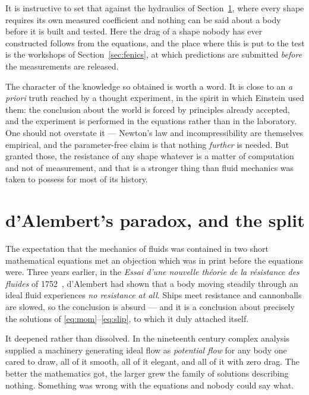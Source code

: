 \documentclass[11pt]{article}
\begin{document}
It is instructive to set that against the hydraulics of Section~\ref{sec:dalembert}, where every
shape requires its own measured coefficient and nothing can be said about a body before it is built
and tested. Here the drag of a shape nobody has ever constructed follows from the equations, and the
place where this is put to the test is the workshops of Section~\ref{sec:fenics}, at which
predictions are submitted \emph{before} the measurements are released.

The character of the knowledge so obtained is worth a word. It is close to an \emph{a priori} truth
reached by a thought experiment, in the spirit in which Einstein used them: the conclusion about the
world is forced by principles already accepted, and the experiment is performed in the equations
rather than in the laboratory. One should not overstate it --- Newton's law and incompressibility are
themselves empirical, and the parameter-free claim is that nothing \emph{further} is needed. But
granted those, the resistance of any shape whatever is a matter of computation and not of
measurement, and that is a stronger thing than fluid mechanics was taken to possess for most of its
history.

\section{d'Alembert's paradox, and the split}\label{sec:dalembert}

The expectation that the mechanics of fluids was contained in two short mathematical equations met an
objection which was in print before the equations were. Three years earlier, in the \emph{Essai d'une
nouvelle th\'eorie de la r\'esistance des fluides} of 1752~\cite{dalembert1752}, d'Alembert had shown
that a body moving steadily through an ideal fluid experiences \emph{no resistance at all}. Ships
meet resistance and cannonballs are slowed, so the conclusion is absurd --- and it is a conclusion
about precisely the solutions of \eqref{eq:mom}--\eqref{eq:slip}, to which it duly attached itself.

It deepened rather than dissolved. In the nineteenth century complex analysis supplied a machinery
generating ideal flow as \emph{potential flow} for any body one cared to draw, all of it smooth, all
of it elegant, and all of it with zero drag. The better the mathematics got, the larger grew the
family of solutions describing nothing. Something was wrong with the equations and nobody could say
what.
\end{document}
